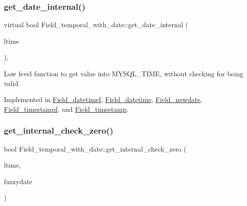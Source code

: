 \subsubsection{\texorpdfstring{get\+\_\+date\+\_\+internal()}{get\_date\_internal()}}
{\footnotesize\ttfamily virtual bool Field\+\_\+temporal\+\_\+with\+\_\+date\+::get\+\_\+date\+\_\+internal (\begin{DoxyParamCaption}\item[{M\+Y\+S\+Q\+L\+\_\+\+T\+I\+ME $\ast$}]{ltime }\end{DoxyParamCaption})\hspace{0.3cm}{\ttfamily [protected]}, {}}

Low level function to get value into M\+Y\+S\+Q\+L\+\_\+\+T\+I\+ME, without checking for being valid. 

Implemented in \mbox{\hyperlink{classField__datetimef_a54497950174c5034fd1ffd97e08bc368}{Field\+\_\+datetimef}}, \mbox{\hyperlink{classField__datetime_ad1b048032be351ce7227d8ab6804fc99}{Field\+\_\+datetime}}, \mbox{\hyperlink{classField__newdate_a108e583a4ec9f51e7f1a28d179b3b725}{Field\+\_\+newdate}}, \mbox{\hyperlink{classField__timestampf_a2f546414955a5ad516e77dc821ff5f47}{Field\+\_\+timestampf}}, and \mbox{\hyperlink{classField__timestamp_aff69ed0b8fb6329aa9dd6dceb14ddd27}{Field\+\_\+timestamp}}.

\mbox{\label{classField__temporal__with__date_a771e7058c51d29caf989396ecbe8bbb3}} 
\subsubsection{\texorpdfstring{get\+\_\+internal\+\_\+check\+\_\+zero()}{get\_internal\_check\_zero()}}
{\footnotesize\ttfamily bool Field\+\_\+temporal\+\_\+with\+\_\+date\+::get\+\_\+internal\+\_\+check\+\_\+zero (\begin{DoxyParamCaption}\item[{M\+Y\+S\+Q\+L\+\_\+\+T\+I\+ME $\ast$}]{ltime,  }\item[{my\+\_\+time\+\_\+flags\+\_\+t}]{fuzzydate }\end{DoxyParamCaption})\hspace{0.3cm}{\ttfamily [protected]}}

